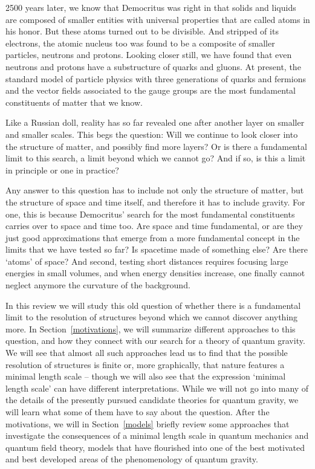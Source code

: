 \documentclass{article}
\begin{document}
2500 years later, we know that Democritus was right in that solids and
liquids are composed of smaller entities with universal properties
that are called atoms in his honor. But these atoms turned out to be
divisible. And stripped of its electrons, the atomic nucleus too was
found to be a composite of smaller particles, neutrons and
protons. Looking closer still, we have found that even neutrons and
protons have a substructure of quarks and gluons. At present, the
standard model of particle physics with three generations of quarks
and fermions and the vector fields associated to the gauge groups are
the most fundamental constituents of matter that we know.

Like a Russian doll, reality has so far revealed one after another
layer on smaller and smaller scales. This begs the question: Will we
continue to look closer into the structure of matter, and possibly
find more layers? Or is there a fundamental limit to this search, a
limit beyond which we cannot go? And if so, is this a limit in
principle or one in practice?

Any answer to this question has to include not only the structure of
matter, but the structure of space and time itself, and therefore it
has to include gravity. For one, this is because Democritus' search
for the most fundamental constituents carries over to space and time
too. Are space and time fundamental, or are they just good
approximations that emerge from a more fundamental concept in the
limits that we have tested so far? Is spacetime made of something
else? Are there `atoms' of space? And second, testing short distances
requires focusing large energies in small volumes, and when energy
densities increase, one finally cannot neglect anymore the curvature
of the background.

In this review we will study this old question of whether there is a
fundamental limit to the resolution of structures beyond which we
cannot discover anything more. In Section~\ref{motivations}, we will
summarize different approaches to this question, and
how they connect with our search for a theory of quantum gravity. We
will see that almost all such approaches lead us to find that the
possible resolution of structures is finite or, more graphically, that
nature features a minimal length scale -- though we will also see that
the expression `minimal length scale' can have different
interpretations. While we will not go into many of the details of the
presently pursued candidate theories for quantum gravity, we will
learn what some of them have to say about the question. After the
motivations, we will in Section~\ref{models} briefly review some
approaches that investigate the consequences of a minimal length scale
in quantum mechanics and quantum field theory, models that have
flourished into one of the best motivated and best developed areas  of
the phenomenology of quantum gravity.
\end{document}
